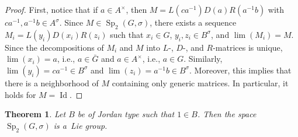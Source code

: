 \documentclass[a4paper,oneside,11pt]{amsart}
\DeclareMathOperator{\Id}{Id}
\DeclareMathOperator{\Sp}{Sp}
\theoremstyle{plain}
\newtheorem{teo}{Theorem}[section]
\theoremstyle{definition}
\theoremstyle{remark}
\begin{document}
\begin{proof} First, notice that if $a\in A^\times$, then $M=L(ca^{-1})D(a)R(a^{-1}b)$ with $ca^{-1}, a^{-1}b\in A^\sigma$. Since $M\in\Sp_2(G,\sigma)$, there exists a sequence $M_i=L(y_i)D(x_i)R(z_i)$ such that $x_i\in G$, $y_i,z_i\in B^\sigma$, and $\lim(M_i)=M$. Since the decompositions of $M_i$ and $M$ into $L$-, $D$-, and $R$-matrices is unique, $\lim(x_i)=a$, i.e., $a\in \bar G$ and $a\in A^\times$, i.e., $a\in G$. Similarly, $\lim (y_i)=ca^{-1}\in B^\sigma$ and $\lim (z_i)=a^{-1}b\in B^\sigma$. Moreover, this implies that there is a neighborhood of $M$ containing only generic matrices. In particular, it holds for $M=\Id$.
\end{proof}


\begin{teo}\label{thm:Sp_2-LieGroup}
Let $B$ be of Jordan type such that $1\in B$. Then the space $\Sp_2(G,\sigma)$ is a~Lie group.
\end{teo}
\end{document}
